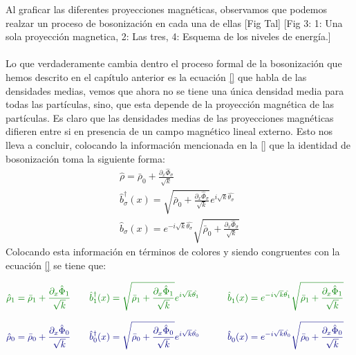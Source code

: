 Al graficar las diferentes proyecciones magnéticas, observamos que podemos realzar un proceso de bosonización en cada una de ellas [Fig Tal] [Fig 3: 1: Una sola proyección magnetica, 2: Las tres, 4: Esquema de los niveles de energía.]\\ \\

Lo que verdaderamente cambia dentro el proceso formal de la bosonización que hemos descrito en el capítulo anterior es la ecuación \eqref{} que habla de las densidades medias, vemos que ahora no se tiene una única densidad media para todas las partículas, sino, que esta depende de la proyección magnética de las partículas. Es claro que las densidades medias de las proyecciones magnéticas difieren entre si en presencia de un campo magnético lineal externo. Esto nos lleva a concluir, colocando la información mencionada en la \eqref{} que la identidad de bosonización toma la siguiente forma:
\begin{align}
    \hat{\rho} = \bar{\rho}_{0} + \frac{\partial_{x} \hat{\Phi}_{\sigma}}{\sqrt{k}} \\
    \hat{b}_{\sigma}^{\dagger} (x) = \sqrt{ \bar{\rho}_{0} + \frac{\partial_{x} \hat{\Phi}_{\sigma}}{\sqrt{k}}} e^{i \sqrt{k} \hat{\theta_{\sigma}}} \\
    \hat{b}_{\sigma}^{} (x) = e^{-i \sqrt{k} \hat{\theta_{\sigma}}} \sqrt{ \bar{\rho}_{0} + \frac{\partial_{x} \hat{\Phi}_{\sigma}}{\sqrt{k}}} 
\end{align}
Colocando esta información en términos de colores y siendo congruentes con la ecuación \eqref{} se tiene que:


\begin{equation}
\begin{aligned}
    \textcolor{mygreen}{\hat{\rho}_{1} = \bar{\rho}_{1} + \frac{\partial_{x} \hat{\Phi}_{1}}{\sqrt{k}}} \quad \quad & \textcolor{mygreen}{\hat{b}_{1}^{\dagger} (x) = \sqrt{ \bar{\rho}_{1} + \frac{\partial_{x} \hat{\Phi}_{1}}{\sqrt{k}}} e^{i \sqrt{k} \hat{\theta_{1}}}} \quad \quad & \textcolor{mygreen}{\hat{b}_{1}^{} (x) = e^{-i \sqrt{k} \hat{\theta_{1}}} \sqrt{ \bar{\rho}_{1} + \frac{\partial_{x} \hat{\Phi}_{1}}{\sqrt{k}}} } \quad 
\end{aligned}
\end{equation}


\begin{equation}
\begin{aligned}
    \textcolor{myblue}{\hat{\rho}_{0} = \bar{\rho}_{0} + \frac{\partial_{x} \hat{\Phi}_{0}}{\sqrt{k}}} \quad \quad & \textcolor{myblue}{\hat{b}_{0}^{\dagger} (x) = \sqrt{ \bar{\rho}_{0} + \frac{\partial_{x} \hat{\Phi}_{0}}{\sqrt{k}}} e^{i \sqrt{k} \hat{\theta_{0}}}} \quad \quad & \textcolor{myblue}{\hat{b}_{0}^{} (x) = e^{-i \sqrt{k} \hat{\theta_{0}}} \sqrt{ \bar{\rho}_{0} + \frac{\partial_{x} \hat{\Phi}_{0}}{\sqrt{k}}} } \quad 
\end{aligned}
\end{equation}

